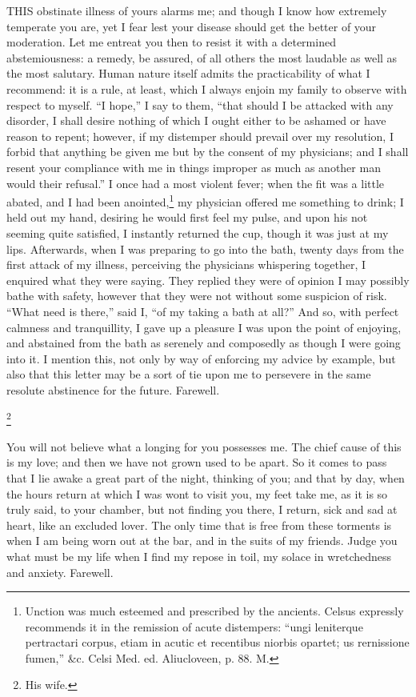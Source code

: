 
THIS obstinate illness of yours alarms me; and though I know how extremely
temperate you are, yet I fear lest your disease should get the better of
your moderation. Let me entreat you then to resist it with a determined
abstemiousness: a remedy, be assured, of all others the most laudable as
well as the most salutary. Human nature itself admits the practicability
of what I recommend: it is a rule, at least, which I always enjoin my
family to observe with respect to myself. ``I hope,'' I say to them, ``that
should I be attacked with any disorder, I shall desire nothing of which I
ought either to be ashamed or have reason to repent; however, if my
distemper should prevail over my resolution, I forbid that anything be
given me but by the consent of my physicians; and I shall resent your
compliance with me in things improper as much as another man would their
refusal.'' I once had a most violent fever; when the fit was a little
abated, and I had been anointed,\footnote{Unction was much
esteemed and prescribed by the ancients. Celsus expressly recommends it in
the remission of acute distempers: ``ungi leniterque pertractari corpus,
etiam in acutic et recentibus niorbis opartet; us rernissione fumen,''
\&c. Celsi Med. ed. Aliucloveen, p. 88. M.} my physician offered
me something to drink; I held out my hand, desiring he would first feel my
pulse, and upon his not seeming quite satisfied, I instantly returned the
cup, though it was just at my lips. Afterwards, when I was preparing to go
into the bath, twenty days from the first attack of my illness, perceiving
the physicians whispering together, I enquired what they were saying. They
replied they were of opinion I may possibly bathe with safety, however
that they were not without some suspicion of risk. ``What need is there,''
said I, ``of my taking a bath at all?'' And so, with perfect calmness and
tranquillity, I gave up a pleasure I was upon the point of enjoying, and
abstained from the bath as serenely and composedly as though I were going
into it. I mention this, not only by way of enforcing my advice by
example, but also that this letter may be a sort of tie upon me to
persevere in the same resolute abstinence for the future. Farewell.


\footnote{His wife.}

You will not believe what a longing for you possesses me. The chief cause
of this is my love; and then we have not grown used to be apart. So it
comes to pass that I lie awake a great part of the night, thinking of you;
and that by day, when the hours return at which I was wont to visit you,
my feet take me, as it is so truly said, to your chamber, but not finding
you there, I return, sick and sad at heart, like an excluded lover. The
only time that is free from these torments is when I am being worn out at
the bar, and in the suits of my friends. Judge you what must be my life
when I find my repose in toil, my solace in wretchedness and anxiety.
Farewell.

